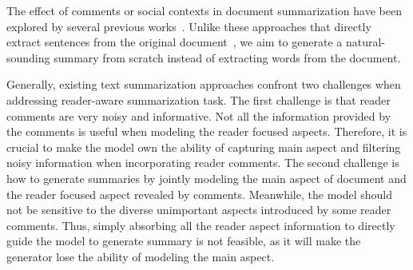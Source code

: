 \documentclass[letterpaper]{article} %
\begin{document}

The effect of comments or social contexts in document summarization have been explored by several previous works~\cite{Hu2008CommentsorientedDS,Yang2011SocialCS,Li2015ReaderAwareMS,li2017reader}.
Unlike these approaches that directly extract sentences from the original document~\cite{Hu2008CommentsorientedDS,Yang2011SocialCS,Li2015ReaderAwareMS}, we aim to generate a natural-sounding summary from scratch instead of extracting words from the document.

Generally, existing text summarization approaches confront two challenges when addressing reader-aware summarization task.
The first challenge is that reader comments are very noisy and informative. 
Not all the information provided by the comments is useful when modeling the reader focused aspects. 
Therefore, it is crucial to make the model own the ability of capturing main aspect and filtering noisy information when incorporating reader comments. 
The second challenge is how to generate summaries by jointly modeling the main aspect of document and the reader focused aspect revealed by comments.
Meanwhile, the model should not be sensitive to the diverse unimportant aspects introduced by some reader comments. 
Thus, simply absorbing all the reader aspect information to directly guide the model to generate summary is not feasible, as it will make the generator lose the ability of modeling the main aspect.
\end{document}
